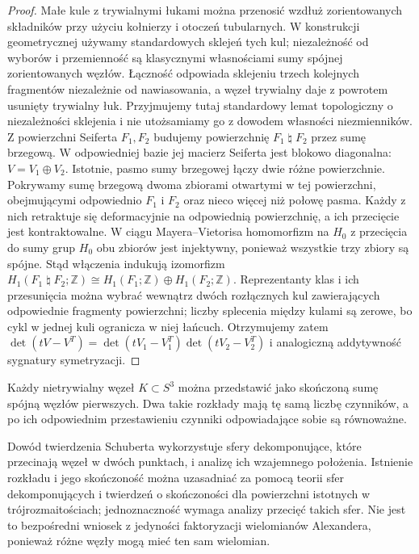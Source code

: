 \begin{proof}
Małe kule z trywialnymi łukami można przenosić wzdłuż
zorientowanych składników przy użyciu kołnierzy i otoczeń
tubularnych. W konstrukcji geometrycznej używamy standardowych
sklejeń tych kul; niezależność od wyborów i przemienność
są klasycznymi własnościami sumy spójnej zorientowanych
węzłów. Łączność odpowiada sklejeniu trzech kolejnych
fragmentów niezależnie od nawiasowania, a węzeł trywialny
daje z powrotem usunięty trywialny łuk. Przyjmujemy tutaj
standardowy lemat topologiczny o niezależności sklejenia
i nie utożsamiamy go z dowodem własności niezmienników. Z powierzchni Seiferta $F_1,F_2$ budujemy
powierzchnię $F_1\mathbin{\natural}F_2$ przez sumę brzegową.
W odpowiedniej bazie jej macierz Seiferta jest blokowo diagonalna:
$V=V_1\oplus V_2$. Istotnie, pasmo sumy brzegowej
łączy dwie różne powierzchnie. Pokrywamy sumę brzegową
dwoma zbiorami otwartymi w tej powierzchni, obejmującymi
odpowiednio $F_1$ i $F_2$ oraz nieco więcej niż połowę pasma.
Każdy z nich retraktuje się deformacyjnie na odpowiednią
powierzchnię, a ich przecięcie jest kontraktowalne.
W ciągu Mayera--Vietorisa homomorfizm na $H_0$ z przecięcia
do sumy grup $H_0$ obu zbiorów jest injektywny, ponieważ
wszystkie trzy zbiory są spójne. Stąd włączenia indukują
izomorfizm $H_1(F_1\mathbin{\natural}F_2;\mathbb Z)
\cong H_1(F_1;\mathbb Z)\oplus H_1(F_2;\mathbb Z)$.
Reprezentanty klas i ich przesunięcia można wybrać wewnątrz
dwóch rozłącznych kul zawierających odpowiednie fragmenty
powierzchni; liczby splecenia między kulami są zerowe,
bo cykl w jednej kuli ogranicza w niej łańcuch.
Otrzymujemy zatem
$\det(tV-V^T)=\det(tV_1-V_1^T)\det(tV_2-V_2^T)$
i analogiczną addytywność sygnatury symetryzacji.
\end{proof}

\begin{twierdzenie}
Każdy nietrywialny węzeł $K\subset S^3$ można przedstawić
jako skończoną sumę spójną węzłów pierwszych. Dwa takie
rozkłady mają tę samą liczbę czynników, a po ich odpowiednim
przestawieniu czynniki odpowiadające sobie są równoważne.
\end{twierdzenie}

\begin{uwaga}
Dowód twierdzenia Schuberta wykorzystuje sfery dekomponujące,
które przecinają węzeł w dwóch punktach, i analizę ich
wzajemnego położenia. Istnienie rozkładu i jego skończoność można uzasadniać
za pomocą teorii sfer dekomponujących i twierdzeń o skończoności
dla powierzchni istotnych w trójrozmaitościach; jednoznaczność
wymaga analizy przecięć takich sfer. Nie jest to
bezpośredni wniosek z jedyności faktoryzacji wielomianów
Alexandera, ponieważ różne węzły mogą mieć ten sam wielomian.
\end{uwaga}

